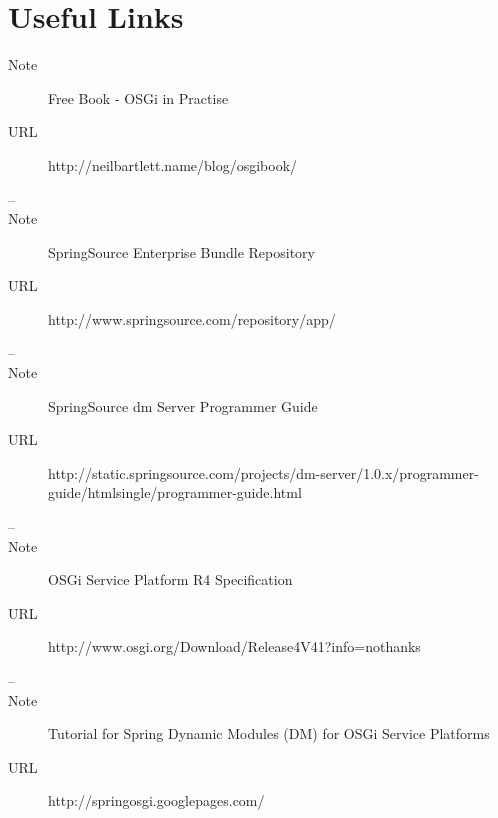 \section{Useful Links}
\begin{description}
\item[Note] Free Book - OSGi in Practise
\item[URL] http://neilbartlett.name/blog/osgibook/
\item[--] 
\item[Note] SpringSource Enterprise Bundle Repository
\item[URL] http://www.springsource.com/repository/app/
\item[--]
\item[Note] SpringSource dm Server Programmer Guide
\item[URL] http://static.springsource.com/projects/dm-server/1.0.x/programmer-guide/htmlsingle/programmer-guide.html
\item[--]
\item[Note] OSGi Service Platform R4 Specification
\item[URL] http://www.osgi.org/Download/Release4V41?info=nothanks
\item[--]
\item[Note] Tutorial for Spring Dynamic Modules (DM) for OSGi Service Platforms
\item[URL] http://springosgi.googlepages.com/
\end{description}
